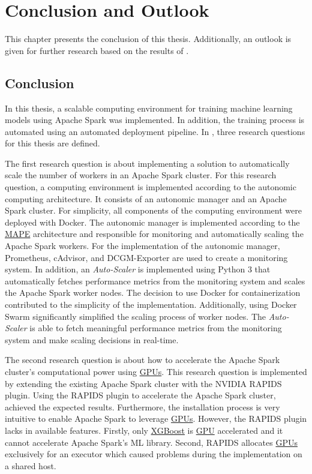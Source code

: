\chapter{Conclusion and Outlook}
\label{chap:08_conclusion-outlook}

This chapter presents the conclusion of this thesis. Additionally, an outlook is given for further research based on the results of .


\section{Conclusion}
\label{sec:08_conclusion}
In this thesis, a scalable computing environment for training machine learning models using Apache Spark was implemented. In addition, the training process is automated using an automated deployment pipeline.
In , three research questions for this thesis are defined.


The first research question is about implementing a solution to automatically scale the number of workers in an Apache Spark cluster.
For this research question, a computing environment is implemented according to the autonomic computing architecture.
It consists of an autonomic manager and an Apache Spark cluster.
For simplicity, all components of the computing environment were deployed with Docker.
The autonomic manager is implemented according to the \hyperlink{abbr:mape}{MAPE} architecture and responsible for monitoring and automatically scaling the Apache Spark workers.
For the implementation of the autonomic manager, Prometheus, cAdvisor, and DCGM-Exporter are used to create a monitoring system.
In addition, an \textit{Auto-Scaler} is implemented using Python 3 that automatically fetches performance metrics from the monitoring system and scales the Apache Spark worker nodes.
The decision to use Docker for containerization contributed to the simplicity of the implementation. Additionally, using Docker Swarm significantly simplified the scaling process of worker nodes. The \textit{Auto-Scaler} is able to fetch meaningful performance metrics from the monitoring system and make scaling decisions in real-time.


The second research question is about how to accelerate the Apache Spark cluster's computational power using \hyperlink{abbr:gpu}{GPUs}.
This research question is implemented by extending the existing Apache Spark cluster with the NVIDIA RAPIDS plugin.
Using the RAPIDS plugin to accelerate the Apache Spark cluster, achieved the expected results. Furthermore, the installation process is very intuitive to enable Apache Spark to leverage \hyperlink{abbr:gpu}{GPUs}. However, the RAPIDS plugin lacks in available features. Firstly, only \hyperlink{abbr:xgboost}{XGBoost} is \hyperlink{abbr:gpu}{GPU} accelerated and it cannot accelerate Apache Spark's ML library. Second, RAPIDS allocates \hyperlink{abbr:gpu}{GPUs} exclusively for an executor which caused problems during the implementation on a shared host.



